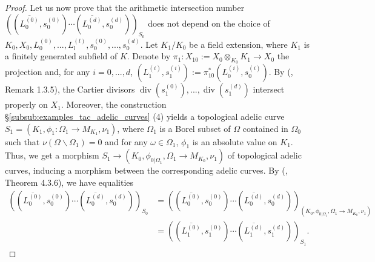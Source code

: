 \documentclass [11pt,reqno]{amsart}
\newcommand{\1}{\mathmybb{1}}
\def\div{\operatorname{div}}
\def\setminus{\smallsetminus}
\begin{document}
\begin{proof}
Let us now prove that the arithmetic intersection number $\left((\overline{L_{0}^{(0)}},s_{0}^{(0)})\cdots(\overline{L_{0}^{(d)}},s_{0}^{(d)})\right)_{S_{0}}$ does not depend on the choice of $K_{0},X_{0},L_{0}^{(0)},...,L_{l}^{(l)},s_{0}^{(0)},...,s_{0}^{(d)}$. Let $K_{1}/K_{0}$ be a field extension, where $K_{1}$ is a finitely generated subfield of $K$. Denote by $\pi_{1}:X_{10}:=X_{0}\otimes_{K_{0}}K_{1} \to X_{0}$ the projection and, for any $i=0,...,d$, $(L_{1}^{(i)},s_{1}^{(i)}):= \pi_{10}^{\ast}(L_{0}^{(i)},s_{0}^{(i)})$. By (\cite{ChenMori21}, Remark 1.3.5), the Cartier divisors $\div(s_{1}^{(0)}),...,\div(s_{1}^{(d)})$ intersect properly on $X_{1}$. Moreover, the construction \S \ref{subsub:examples_tac_adelic_curves} (4) yields a topological adelic curve $S_{1}=(K_{1},\phi_{1}:\Omega_{1}\to M_{K_{1}},\nu_{1})$, where $\Omega_{1}$ is a Borel subset of $\Omega$ contained in $\Omega_{0}$ such that $\nu(\Omega\setminus\Omega_{1})=0$ and for any $\omega\in\Omega_{1}$, $\phi_{1}$ is an absolute value on $K_{1}$. Thus, we get a morphism $S_{1}\to (K_{0},\phi_{0|\Omega_{1}},\Omega_{1}\to M_{K_{0}},\nu_{1})$ of topological adelic curves, inducing a morphism between the corresponding adelic curves. By (\cite{ChenMori21}, Theorem 4.3.6), we have equalities
\begin{align}
\label{eq:invariance_intersection_number_covering}
\left((\overline{L_{0}^{(0)}},s_{0}^{(0)})\cdots(\overline{L_{0}^{(d)}},s_{0}^{(d)})\right)_{S_{0}} &= \left((\overline{L_{0}^{(0)}},s_{0}^{(0)})\cdots(\overline{L_{0}^{(d)}},s_{0}^{(d)})\right)_{(K_{0},\phi_{0|\Omega_{1}},\Omega_{1}\to M_{K_{0}},\nu_{1})} \nonumber\\
&= \left((\overline{L_{1}^{(0)}},s_{1}^{(0)})\cdots(\overline{L_{1}^{(d)}},s_{1}^{(d)})\right)_{S_{1}}.
\end{align}

\end{proof}
\end{document}
